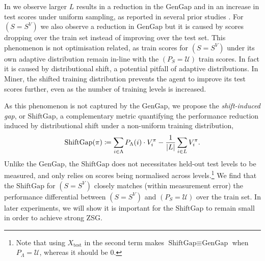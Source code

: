 \documentclass{article}
\theoremstyle{plain}
\theoremstyle{definition}
\theoremstyle{remark}
\begin{document}
In  we observe larger $L$ results in a reduction in the $\text{GenGap}$ and in an increase in test scores under uniform sampling, as reported in several prior studies \citep{OverfittingDRL,procgen,Packer2018AssessingGI}. For $(S=S^V)$ we also observe a reduction in $\text{GenGap}$ but it is caused by scores dropping over the train set instead of improving over the test set. This phenomenon is not optimisation related, as train scores for $(S=S^V)$ under its own adaptive distribution remain in-line with the $(P_S=\mathcal{U})$ train scores. In fact it is caused by distributional shift, a potential pitfall of adaptive distributions. In Miner, the shifted training distribution prevents the agent to improve its test scores further, even as the number of training levels is increased. 

As this phenomenon is not captured by the $\text{GenGap}$, %
we propose the \textit{shift-induced gap}, or $\text{ShiftGap}$, a complementary metric quantifying the performance reduction induced by distributional shift under a non-uniform training distribution,
\begin{equation} \label{eq:ShiftGap}
    \text{ShiftGap}(\pi) \coloneqq \sum_{i \in \Lambda} P_\Lambda(i) \cdot V^\pi_{i} - \frac{1}{|L|} \sum_{i \in L} V^\pi_{i}.
\end{equation}
Unlike the $\text{GenGap}$, the $\text{ShiftGap}$ does not necessitates held-out test levels to be measured, and only relies on scores being normalised across levels.\footnote{Note that using $X_\text{test}$ in the second term makes $\text{ShiftGap}\equiv\text{GenGap}$ when $P_\Lambda = \mathcal{U}$, whereas it should be 0.} We find that the $\text{ShiftGap}$ for $(S=S^V)$ closely matches (within measurement error) the performance differential between $(S=S^V)$ and $(P_S=\mathcal{U})$ over the train set. In later experiments, we will show it is important for the $\text{ShiftGap}$ to remain small in order to achieve strong ZSG.
%
\end{document}
